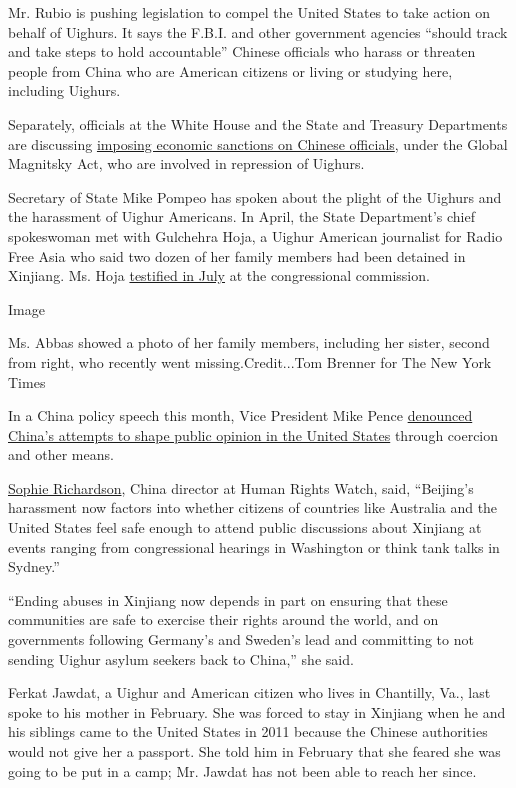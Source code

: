 Mr. Rubio is pushing legislation to compel the United States to take
action on behalf of Uighurs. It says the F.B.I. and other government
agencies ``should track and take steps to hold accountable'' Chinese
officials who harass or threaten people from China who are American
citizens or living or studying here, including Uighurs.

Separately, officials at the White House and the State and Treasury
Departments are discussing
\href{https://www.nytimes.com/2018/09/10/world/asia/us-china-sanctions-muslim-camps.html}{imposing
economic sanctions on Chinese officials}, under the Global Magnitsky
Act, who are involved in repression of Uighurs.

Secretary of State Mike Pompeo has spoken about the plight of the
Uighurs and the harassment of Uighur Americans. In April, the State
Department's chief spokeswoman met with Gulchehra Hoja, a Uighur
American journalist for Radio Free Asia who said two dozen of her family
members had been detained in Xinjiang. Ms. Hoja
\href{https://www.youtube.com/watch?v=8awQJ2Xnd1U}{testified in July} at
the congressional commission.

Image

Ms. Abbas showed a photo of her family members, including her sister,
second from right, who recently went missing.Credit...Tom Brenner for
The New York Times

In a China policy speech this month, Vice President Mike Pence
\href{https://www.whitehouse.gov/briefings-statements/remarks-vice-president-pence-administrations-policy-toward-china/}{denounced
China's attempts to shape public opinion in the United States} through
coercion and other means.

\href{https://www.hrw.org/about/people/sophie-richardson}{Sophie
Richardson}, China director at Human Rights Watch, said, ``Beijing's
harassment now factors into whether citizens of countries like Australia
and the United States feel safe enough to attend public discussions
about Xinjiang at events ranging from congressional hearings in
Washington or think tank talks in Sydney.''

``Ending abuses in Xinjiang now depends in part on ensuring that these
communities are safe to exercise their rights around the world, and on
governments following Germany's and Sweden's lead and committing to not
sending Uighur asylum seekers back to China,'' she said.

Ferkat Jawdat, a Uighur and American citizen who lives in Chantilly,
Va., last spoke to his mother in February. She was forced to stay in
Xinjiang when he and his siblings came to the United States in 2011
because the Chinese authorities would not give her a passport. She told
him in February that she feared she was going to be put in a camp; Mr.
Jawdat has not been able to reach her since.

